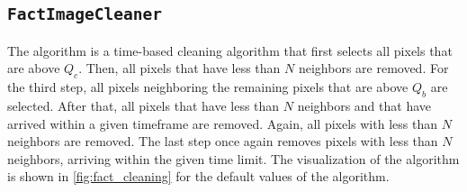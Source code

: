 \subsection{\texttt{FactImageCleaner}}
\vspace{-0.5cm}
The \fact{} algorithm \cite{temme_thesis, temme_diploma} is a time-based cleaning algorithm that first selects all pixels that are above
\(Q_c\). Then, all pixels that have less than \(N\) neighbors are removed.
For the third step, all pixels neighboring
the remaining pixels that are above \(Q_b\) are selected. After that, all
pixels that have less than \(N\) neighbors and that have arrived within a given timeframe are removed.
Again, all pixels with less than \(N\) neighbors are removed. The last step once again removes pixels with less than
\(N\) neighbors, arriving within the given time limit. The visualization of the algorithm is shown in
\autoref{fig:fact_cleaning} for the default values of the algorithm.
\vspace{-0.75cm}
